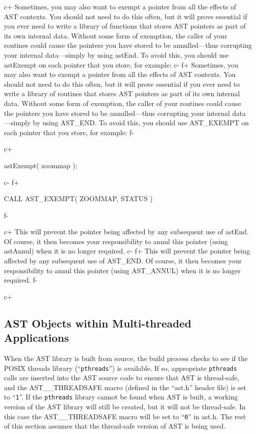 \documentclass[twoside,11pt]{starlink}
\begin{document}
c+
Sometimes, you may also want to exempt a pointer from all the effects
of AST contexts. You should not need to do this often, but it will
prove essential if you ever need to write a library of functions that
stores AST pointers as part of its own internal data. Without some
form of exemption, the caller of your routines could cause the
pointers you have stored to be annulled---thus corrupting your
internal data---simply by using astEnd. To avoid this, you should use
astExempt on each pointer that you store, for example:
c-
f+
Sometimes, you may also want to exempt a pointer from all the effects
of AST contexts. You should not need to do this often, but it will
prove essential if you ever need to write a library of routines that
stores AST pointers as part of its own internal data. Without some
form of exemption, the caller of your routines could cause the
pointers you have stored to be annulled---thus corrupting your
internal data---simply by using AST\_END. To avoid this, you should
use AST\_EXEMPT on each pointer that you store, for example:
f-

c+
\small
\begin{terminalv}
astExempt( zoommap );
\end{terminalv}
\normalsize
c-
f+
\small
\begin{terminalv}
      CALL AST_EXEMPT( ZOOMMAP, STATUS )
\end{terminalv}
\normalsize
f-

c+
This will prevent the pointer being affected by any subsequent use of
astEnd. Of course, it then becomes your responsibility to annul this
pointer (using astAnnul) when it is no longer required.
c-
f+
This will prevent the pointer being affected by any subsequent use of
AST\_END. Of course, it then becomes your responsibility to annul this
pointer (using AST\_ANNUL) when it is no longer required.
f-


c+
\subsection{AST Objects within Multi-threaded Applications}

When the AST library is built from source, the build process checks to
see if the POSIX threads library (``\texttt{pthreads}'') is available. If so,
appropriate \texttt{pthreads} calls are inserted into the AST source code to
ensure that AST is thread-safe, and the AST\_\_THREADSAFE macro (defined
in the ``ast.h'' header file) is set to ``\texttt{1}''. If the \texttt{pthreads}
library cannot be found when AST is built, a working version of the AST
library will still be created, but it will not be thread-safe. In this
case the AST\_\_THREADSAFE macro will be set to ``\texttt{0}'' in ast.h. The
rest of this section assumes that the thread-safe version of AST is being
used.
\end{document}
